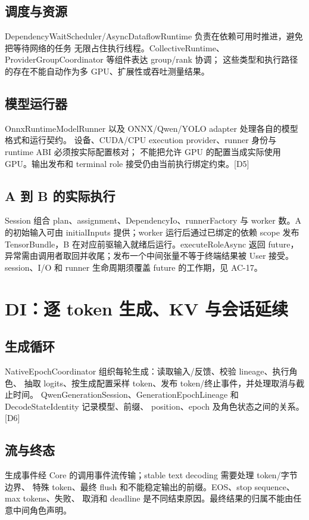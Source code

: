 \subsection{调度与资源}
DependencyWaitScheduler/AsyncDataflowRuntime 负责在依赖可用时推进，避免把等待网络的任务
无限占住执行线程。CollectiveRuntime、ProviderGroupCoordinator 等组件表达 group/rank 协调；
这些类型和执行路径的存在不能自动作为多 GPU、扩展性或吞吐测量结果。

\subsection{模型运行器}
OnnxRuntimeModelRunner 以及 ONNX/Qwen/YOLO adapter 处理各自的模型格式和运行契约。
设备、CUDA/CPU execution provider、runner 身份与 runtime ABI 必须按实际配置核对；
不能把允许 GPU 的配置当成实际使用 GPU。输出发布和 terminal role 接受仍由当前执行绑定约束。[D5]


\subsection{A 到 B 的实际执行}
Session 组合 plan、assignment、DependencyIo、runnerFactory 与 worker 数。A 的初始输入可由 initialInputs 提供；worker 运行后通过已绑定的依赖 scope 发布 TensorBundle，B 在对应前驱输入就绪后运行。executeRoleAsync 返回 future，异常需由调用者取回并收尾；发布一个中间张量不等于终端结果被 User 接受。session、I/O 和 runner 生命周期须覆盖 future 的工作期，见 AC-17。

\newpage

\section{DI：逐 token 生成、KV 与会话延续}
\subsection{生成循环}
NativeEpochCoordinator 组织每轮生成：读取输入/反馈、校验 lineage、执行角色、
抽取 logits、按生成配置采样 token、发布 token/终止事件，并处理取消与截止时间。
QwenGenerationSession、GenerationEpochLineage 和 DecodeStateIdentity 记录模型、前缀、
position、epoch 及角色状态之间的关系。[D6]

\subsection{流与终态}
生成事件经 Core 的调用事件流传输；stable text decoding 需要处理 token/字节边界、
特殊 token、最终 flush 和不能稳定输出的前缀。EOS、stop sequence、max tokens、失败、
取消和 deadline 是不同结束原因。最终结果的归属不能由任意中间角色声明。

